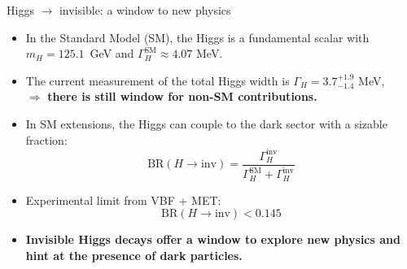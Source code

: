 \documentclass{../../bredelebeamer}
\begin{document}
\begin{frame}{Higgs $\to$ invisible: a window to new physics}
  \begin{itemize}
    \item In the Standard Model (SM), the Higgs is a fundamental scalar with $m_H = 125.1$~GeV and $\Gamma_H^{\text{SM}} \approx 4.07$ MeV.
    \vfill
    \item The current measurement of the total Higgs width is $\Gamma_H = 3.7^{+1.9}_{-1.4}$ MeV,\\ $\Rightarrow$ \textbf{there is still window for non-SM contributions.}
    \vfill
    \item In SM extensions, the Higgs can couple to the dark sector with a sizable fraction:
    \[
      \text{BR}(H \to \text{inv}) = \frac{\Gamma_H^{\text{inv}}}{\Gamma_H^{\text{SM}} + \Gamma_H^{\text{inv}}}
    \]
    
    \item Experimental limit from VBF + MET:
    \[
      \text{BR}(H \to \text{inv}) < 0.145
    \]
    \vfill
    \item  \textbf{Invisible Higgs decays offer a window to explore new physics and hint at the presence of dark particles.}
  \end{itemize}
\end{frame}
\end{document}
